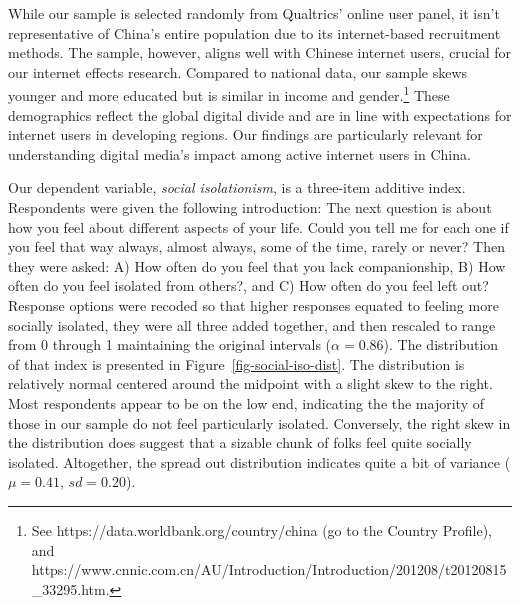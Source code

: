 \documentclass[]{interact}
\theoremstyle{plain}%
\theoremstyle{definition}
\theoremstyle{remark}
\begin{document}
While our sample is selected randomly from Qualtrics' online user panel,
it isn't representative of China's entire population due to its
internet-based recruitment methods. The sample, however, aligns well
with Chinese internet users, crucial for our internet effects research.
Compared to national data, our sample skews younger and more educated
but is similar in income and gender.\footnote{See
  https://data.worldbank.org/country/china (go to the Country Profile),
  and
  https://www.cnnic.com.cn/AU/Introduction/Introduction/201208/t20120815\_33295.htm.}
These demographics reflect the global digital divide and are in line
with expectations for internet users in developing regions. Our findings
are particularly relevant for understanding digital media's impact among
active internet users in China.

Our dependent variable, \emph{social isolationism}, is a three-item
additive index. Respondents were given the following introduction: The
next question is about how you feel about different aspects of your
life. Could you tell me for each one if you feel that way always, almost
always, some of the time, rarely or never? Then they were asked: A) How
often do you feel that you lack companionship, B) How often do you feel
isolated from others?, and C) How often do you feel left out? Response
options were recoded so that higher responses equated to feeling more
socially isolated, they were all three added together, and then rescaled
to range from 0 through 1 maintaining the original intervals
(\(\alpha = 0.86\)). The distribution of that index is presented in
Figure~\ref{fig-social-iso-dist}. The distribution is relatively normal
centered around the midpoint with a slight skew to the right. Most
respondents appear to be on the low end, indicating the the majority of
those in our sample do not feel particularly isolated. Conversely, the
right skew in the distribution does suggest that a sizable chunk of
folks feel quite socially isolated. Altogether, the spread out
distribution indicates quite a bit of variance (\(\mu = 0.41\),
\(sd = 0.20\)).
\end{document}
